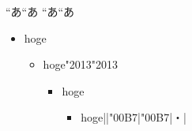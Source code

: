 \documentclass{article}
\begin{document}
{\tracingall\let\char=\ltjalchar\textquotedblleft}あ\textquotedblleft あ%
{\let\char=\ltjjachar\textquotedblleft}あ“あ

\begin{itemize}
\item hoge
\begin{itemize}
\item hoge\textendash\ltjjachar"2013\ltjalchar"2013
\begin{itemize}
\item hoge
\begin{itemize}
\item hoge|\textperiodcentered|\ltjjachar"00B7|\ltjalchar"00B7|・|
\end{itemize}
\end{itemize}
\end{itemize}
\end{itemize}
\end{document}
